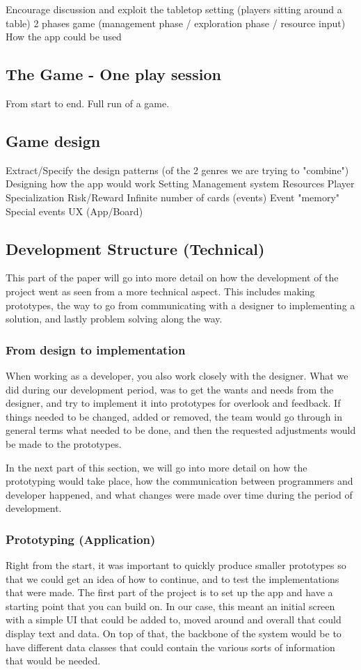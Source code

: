 Encourage discussion and exploit the tabletop setting (players sitting around a table)
2 phases game (management phase / exploration phase / resource input)
How the app could be used
\subsection{The Game - One play session}
From start to end. Full run of a game.
\subsection{Game design}
Extract/Specify the design patterns (of the 2 genres we are trying to "combine")
Designing how the app would work
Setting
Management system
Resources
Player Specialization
Risk/Reward
Infinite number of cards (events)
Event "memory"
Special events
UX (App/Board)

\subsection{Development Structure (Technical)}
This part of the paper will go into more detail on how the development of the project went as seen from a more technical aspect. This includes making prototypes, the way to go from communicating with a designer to implementing a solution, and lastly problem solving along the way.
\subsubsection{From design to implementation}
When working as a developer, you also work closely with the designer. What we did during our development period, was to get the wants and needs from the designer, and try to implement it into prototypes for overlook and feedback. 
If things needed to be changed, added or removed, the team would go through in general terms what needed to be done, and then the requested adjustments would be made to the prototypes.

In the next part of this section, we will go into more detail on how the prototyping would take place, how the communication between programmers and developer happened, and what changes were made over time during the period of development.

\subsubsection{Prototyping (Application)}
Right from the start, it was important to quickly produce smaller prototypes so that we could get an idea of how to continue, and to test the implementations that were made. The first part of the project is to set up the app and have a starting point that you can build on. In our case, this meant an initial screen with a simple UI that could be added to, moved around and overall that could display text and data. On top of that, the backbone of the system would be to have different data classes that could contain the various sorts of information that would be needed.


